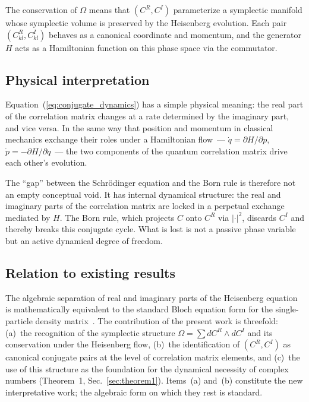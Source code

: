 \documentclass[aps,pra,preprint,groupedaddress,amsmath,amssymb,floatfix]{revtex4-2}
\begin{document}
The conservation of $\Omega$ means that $(C^R, C^I)$ parameterize a symplectic manifold whose symplectic volume is preserved by the Heisenberg evolution. Each pair $(C^R_{kl}, C^I_{kl})$ behaves as a canonical coordinate and momentum, and the generator $H$ acts as a Hamiltonian function on this phase space via the commutator.

\subsection{Physical interpretation}
\label{sec:interpretation}

Equation~(\ref{eq:conjugate_dynamics}) has a simple physical meaning: the real part of the correlation matrix changes at a rate determined by the imaginary part, and vice versa. In the same way that position and momentum in classical mechanics exchange their roles under a Hamiltonian flow~--- $\dot{q} = \partial H/\partial p$, $\dot{p} = -\partial H/\partial q$~--- the two components of the quantum correlation matrix drive each other's evolution.

The ``gap'' between the Schr\"odinger equation and the Born rule is therefore not an empty conceptual void. It has internal dynamical structure: the real and imaginary parts of the correlation matrix are locked in a perpetual exchange mediated by $H$. The Born rule, which projects $C$ onto $C^R$ via $|\cdot|^2$, discards $C^I$ and thereby breaks this conjugate cycle. What is lost is not a passive phase variable but an active dynamical degree of freedom.

\subsection{Relation to existing results}
\label{sec:related_existing}

The algebraic separation of real and imaginary parts of the Heisenberg equation is mathematically equivalent to the standard Bloch equation form for the single-particle density matrix~\cite{peschel2009}. The contribution of the present work is threefold: (a)~the recognition of the symplectic structure $\Omega = \sum dC^R \wedge dC^I$ and its conservation under the Heisenberg flow, (b)~the identification of $(C^R, C^I)$ as canonical conjugate pairs at the level of correlation matrix elements, and (c)~the use of this structure as the foundation for the dynamical necessity of complex numbers (Theorem~1, Sec.~\ref{sec:theorem1}). Items~(a) and~(b) constitute the new interpretative work; the algebraic form on which they rest is standard.
\end{document}
